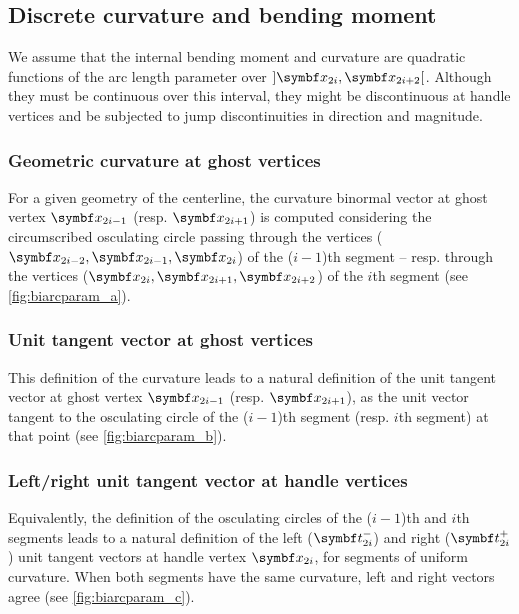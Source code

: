 \subsection{Discrete curvature and bending moment}
We assume that the internal bending moment and curvature are quadratic functions of the arc length parameter over $]\vect{x}_{2i},  \vect{x}_{2i+2}[$.
Although they must be continuous over this interval, they might be discontinuous at handle vertices and be subjected to jump discontinuities in direction and magnitude.

\subsubsection{Geometric curvature at ghost vertices}
For a given geometry of the centerline, the curvature binormal vector at ghost vertex  $\vect{x}_{2i-1}$ (resp. $\vect{x}_{2i+1}$) is computed considering the circumscribed osculating circle passing through the vertices ($\vect{x}_{2i-2}, \vect{x}_{2i-1},  \vect{x}_{2i}$) of the ($i-1$)th segment -- resp. through the vertices ($\vect{x}_{2i}, \vect{x}_{2i+1},  \vect{x}_{2i+2}$) of the $i$th segment (see \cref{fig:biarcparam_a}).

\subsubsection{Unit tangent vector at ghost vertices}
This definition of the curvature leads to a natural definition of the unit tangent vector at ghost vertex $\vect{x}_{2i-1}$ (resp. $\vect{x}_{2i+1}$), as the unit vector tangent to the osculating circle of the ($i-1$)th segment (resp. $i$th segment) at that point (see \cref{fig:biarcparam_b}).

\subsubsection{Left/right unit tangent vector at handle vertices}
Equivalently, the definition of the osculating circles of the ($i-1$)th and $i$th segments leads to a natural definition of the left ($\vect{t}_{2i}^-$) and right ($\vect{t}_{2i}^+$) unit tangent vectors at handle vertex $\vect{x}_{2i}$, for segments of uniform curvature. When both segments have the same curvature, left and right vectors agree (see \cref{fig:biarcparam_c}).

